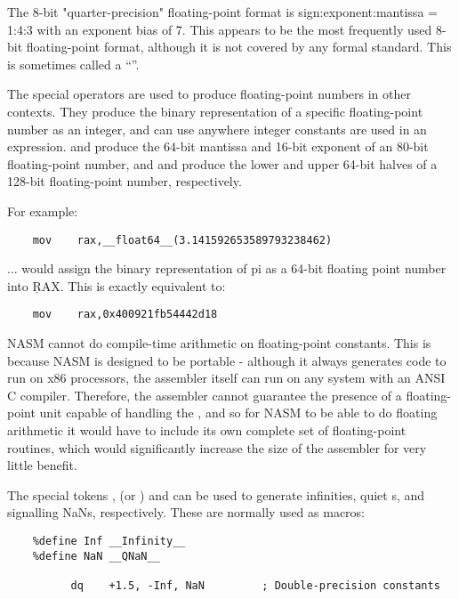 The 8-bit "quarter-precision" floating-point format is
sign:exponent:mantissa = 1:4:3 with an exponent bias of 7. This
appears to be the most frequently used 8-bit floating-point format,
although it is not covered by any formal standard. This is sometimes
called a ``''.

The special operators are used to produce floating-point numbers in
other contexts. They produce the binary representation of a specific
floating-point number as an integer, and can use anywhere integer
constants are used in an expression.  and
 produce the 64-bit mantissa and 16-bit
exponent of an 80-bit floating-point number, and 
and  produce the lower and upper 64-bit halves
of a 128-bit floating-point number, respectively.

For example:

\begin{lstlisting}
	mov    rax,__float64__(3.141592653589793238462)
\end{lstlisting}

... would assign the binary representation of pi as a 64-bit floating
point number into \c{RAX}. This is exactly equivalent to:

\begin{lstlisting}
	mov    rax,0x400921fb54442d18
\end{lstlisting}

NASM cannot do compile-time arithmetic on floating-point constants.
This is because NASM is designed to be portable - although it always
generates code to run on x86 processors, the assembler itself can
run on any system with an ANSI C compiler. Therefore, the assembler
cannot guarantee the presence of a floating-point unit capable of
handling the , and so for NASM
to be able to do floating arithmetic it would have to include its
own complete set of floating-point routines, which would significantly
increase the size of the assembler for very little benefit.

The special tokens ,  (or
) and  can be used to generate
infinities, quiet s, and signalling NaNs,
respectively. These are normally used as macros:

\begin{lstlisting}
	%define Inf __Infinity__
	%define NaN __QNaN__

	      dq    +1.5, -Inf, NaN         ; Double-precision constants
\end{lstlisting}

